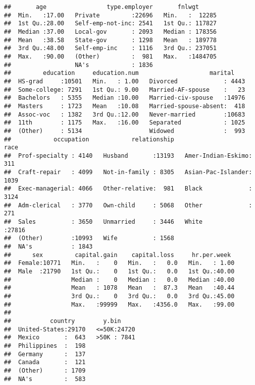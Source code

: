 \documentclass[12pt,]{article}
\begin{document}
\begin{verbatim}
##       age                 type.employer       fnlwgt       
##  Min.   :17.00   Private         :22696   Min.   :  12285  
##  1st Qu.:28.00   Self-emp-not-inc: 2541   1st Qu.: 117827  
##  Median :37.00   Local-gov       : 2093   Median : 178356  
##  Mean   :38.58   State-gov       : 1298   Mean   : 189778  
##  3rd Qu.:48.00   Self-emp-inc    : 1116   3rd Qu.: 237051  
##  Max.   :90.00   (Other)         :  981   Max.   :1484705  
##                  NA's            : 1836                    
##         education     education.num                    marital     
##  HS-grad     :10501   Min.   : 1.00   Divorced             : 4443  
##  Some-college: 7291   1st Qu.: 9.00   Married-AF-spouse    :   23  
##  Bachelors   : 5355   Median :10.00   Married-civ-spouse   :14976  
##  Masters     : 1723   Mean   :10.08   Married-spouse-absent:  418  
##  Assoc-voc   : 1382   3rd Qu.:12.00   Never-married        :10683  
##  11th        : 1175   Max.   :16.00   Separated            : 1025  
##  (Other)     : 5134                   Widowed              :  993  
##            occupation            relationship                   race      
##  Prof-specialty : 4140   Husband       :13193   Amer-Indian-Eskimo:  311  
##  Craft-repair   : 4099   Not-in-family : 8305   Asian-Pac-Islander: 1039  
##  Exec-managerial: 4066   Other-relative:  981   Black             : 3124  
##  Adm-clerical   : 3770   Own-child     : 5068   Other             :  271  
##  Sales          : 3650   Unmarried     : 3446   White             :27816  
##  (Other)        :10993   Wife          : 1568                             
##  NA's           : 1843                                                    
##      sex         capital.gain    capital.loss     hr.per.week   
##  Female:10771   Min.   :    0   Min.   :   0.0   Min.   : 1.00  
##  Male  :21790   1st Qu.:    0   1st Qu.:   0.0   1st Qu.:40.00  
##                 Median :    0   Median :   0.0   Median :40.00  
##                 Mean   : 1078   Mean   :  87.3   Mean   :40.44  
##                 3rd Qu.:    0   3rd Qu.:   0.0   3rd Qu.:45.00  
##                 Max.   :99999   Max.   :4356.0   Max.   :99.00  
##                                                                 
##           country        y.bin      
##  United-States:29170   <=50K:24720  
##  Mexico       :  643   >50K : 7841  
##  Philippines  :  198                
##  Germany      :  137                
##  Canada       :  121                
##  (Other)      : 1709                
##  NA's         :  583
\end{verbatim}
\end{document}
